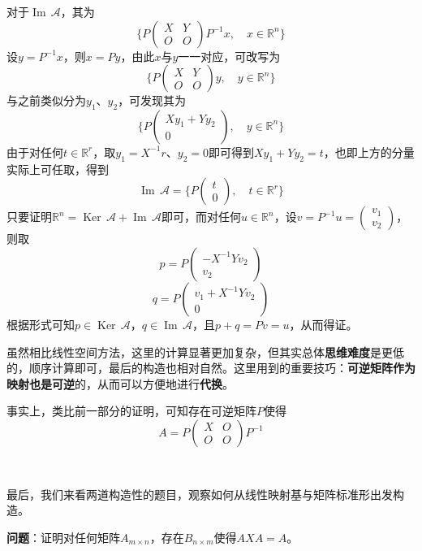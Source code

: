 \documentclass[a4paper,UTF8,fontset=windows]{ctexart}
\DeclareMathOperator{\im}{Im\,}
\DeclareMathOperator{\Ker}{Ker\,}
\newcommand*{\ma}{\mathcal{A}}
\newcommand*{\note}{\noindent *}
\begin{document}
\begin{enumerate}
    对于$\im\ma$，其为
    $$\bigg\{P\begin{pmatrix}X&Y\\O&O\end{pmatrix}P^{-1}x,\quad x\in\mathbb{R}^n\bigg\}$$
    设$y=P^{-1}x$，则$x=Py$，由此$x$与$y$一一对应，可改写为
    $$\bigg\{P\begin{pmatrix}X&Y\\O&O\end{pmatrix}y,\quad y\in\mathbb{R}^n\bigg\}$$
    与之前类似分为$y_1$、$y_2$，可发现其为
    $$\bigg\{P\begin{pmatrix}Xy_1+Yy_2\\0\end{pmatrix},\quad y\in\mathbb{R}^n\bigg\}$$
    由于对任何$t\in\mathbb{R}^r$，取$y_1=X^{-1}r$、$y_2=0$即可得到$Xy_1+Yy_2=t$，也即上方的分量实际上可任取，得到
    $$\im\ma=\bigg\{P\begin{pmatrix}t\\0\end{pmatrix},\quad t\in\mathbb{R}^r\bigg\}$$
    只要证明$\mathbb{R}^n=\Ker\ma+\im\ma$即可，而对任何$u\in\mathbb{R}^n$，设$v=P^{-1}u=\begin{pmatrix}v_1\\v_2\end{pmatrix}$，则取
    $$p=P\begin{pmatrix}-X^{-1}Yv_2\\v_2\end{pmatrix}$$
    $$q=P\begin{pmatrix}v_1+X^{-1}Yv_2\\0\end{pmatrix}$$
    根据形式可知$p\in\Ker\ma$，$q\in\im\ma$，且$p+q=Pv=u$，从而得证。 

    \note 虽然相比线性空间方法，这里的计算显著更加复杂，但其实总体\textbf{思维难度}是更低的，顺序计算即可，最后的构造也相对自然。这里用到的重要技巧：\textbf{可逆矩阵作为映射也是可逆}的，从而可以方便地进行\textbf{代换}。

    \note 事实上，类比前一部分的证明，可知存在可逆矩阵$P$使得
    $$A=P\begin{pmatrix}X&O\\O&O\end{pmatrix}P^{-1}$$
\end{enumerate}

\

最后，我们来看两道构造性的题目，观察如何从线性映射基与矩阵标准形出发构造。

\textbf{问题}：证明对任何矩阵$A_{m\times n}$，存在$B_{n\times m}$使得$AXA=A$。
    
\end{document}
